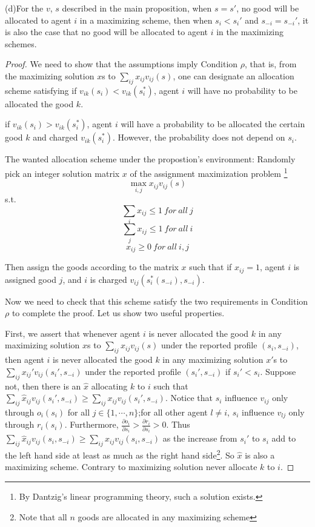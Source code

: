 \begin{lemma*}
  (d)For the $v$, $s$ described in the main proposition, when $s= s'$, no good will be allocated to agent $i$ in a maximizing scheme, then when $s_i < s_i'$ and $s_{-i}=s_{-i}'$, it is also the case that no good will be allocated to agent $i$ in the maximizing schemes. 
\end{lemma*}



  


\begin{proof}
  We need to show that the assumptions imply Condition $\rho$, that is, from the maximizing solution $x$s to  $\sum_{ij}x_{ij}v_{ij}(s)$, one can designate an allocation scheme satisfying
  if $v_{ik}(s_i) < v_{ik}(s_i^*)$, agent $i$ will have no probability to be allocated the good $k$. %

  if $v_{ik}(s_i) > v_{ik}(s_i^*)$, agent $i$ will have a probability to be allocated the certain good $k$ and charged $ v_{ik}(s_i^*)$. However, the probability does not depend on $s_i$.

  The wanted allocation scheme under the propostion's environment: Randomly pick an integer solution matrix $x$ of  the assignment maximization problem \footnote{By Dantzig's linear programming theory, such a solution exists.} 
 $$\max_{i,j}x_{ij}v_{ij}(s)$$
 s.t.
 $$\sum_i x_{ij} \leq 1\ for\ all\ j $$
 $$\sum_j x_{ij} \leq 1\ for\ all\ i $$
 $$x_{ij} \geq 0\ for\ all\ i,j $$

 Then assign the goods according to the matrix $x$ such that if $x_{ij}=1$, agent $i$ is assigned good $j$, and $i$ is
 charged $v_{ij}(s_i^*(s_{-i}), s_{-i})$.


 Now we need to check that this scheme satisfy the two requirements in Condition $\rho$ to complete the proof. Let us show two useful properties.

 First, we assert that whenever agent $i$ is never allocated the good $k$ in any maximizing solution $x$s to  $\sum_{ij}x_{ij}v_{ij}(s)$ under the reported profile $(s_i,s_{-i})$, then agent $i$ is never allocated the good $k$ in any maximizing solution $x'$s to  $\sum_{ij}x_{ij}'v_{ij}(s_i', s_{-i})$ under the reported profile $(s_i',s_{-i})$ if $s_i' < s_i$. Suppose not, then there is an $\hat{x}$ allocating $k$ to $i$ such that $\sum_{ij}\hat{x}_{ij}v_{ij}(s_i', s_{-i}) \geq \sum_{ij}x_{ij}v_{ij}(s_i',s_{-i})$. Notice that $s_i$ influence $v_{ij}$ only through $o_i(s_i)$ for all $j \in \{1,\cdots,n\}$;for all other agent $l \not = i$, $s_i$ influence $v_{lj}$ only through $r_i(s_i)$. Furthermore, $\frac{\partial o_i}{\partial s_i}> \frac{\partial r_i}{\partial s_i} > 0$. Thus $\sum_{ij}\hat{x}_{ij}v_{ij}(s_i, s_{-i}) \geq \sum_{ij}x_{ij}v_{ij}(s_i,s_{-i})$ as the increase from $s_i'$ to $s_i$ add to the left hand side at least as much as the right hand side\footnote{Note that all $n$ goods are allocated in any maximizing scheme}. So $\hat{x}$ is also a maximizing scheme. Contrary to  maximizing solution never allocate $k$ to $i$.


\end{proof}
